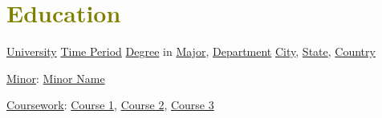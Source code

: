 

\section{\textcolor{olive}{\textbf{Education}}}
	\resumeSubHeadingListStart
		
    \resumeSubheading
        {\underline{University}}
        {\underline{Time Period}}
        {\underline{Degree} in \underline{Major}, \underline{Department}}
        {\textcolor{gray}{\footnotesize{\faMapMarker}} \underline{City}, \underline{State}, \underline{Country}}

    \resumeItemListStart
        \item {
            \underline{Minor}: \underline{Minor Name}
        }
        \item {
            \underline{Coursework}: \underline{Course 1}, \underline{Course 2}, \underline{Course 3}
        }
    \resumeItemListEnd
		  
	\resumeSubHeadingListEnd
